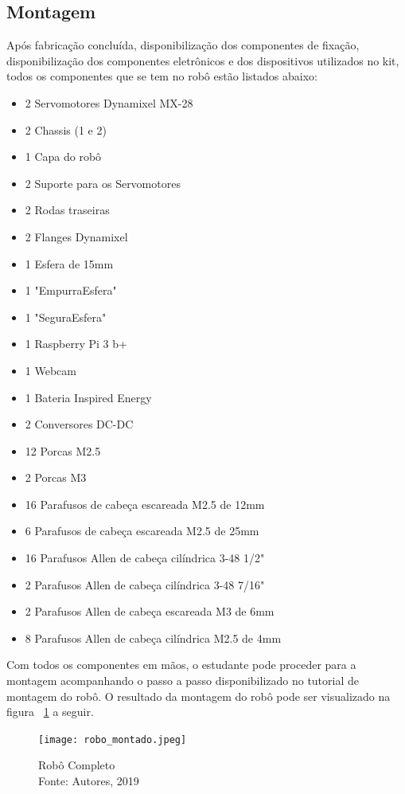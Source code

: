 \subsection{Montagem}
Após fabricação concluída, disponibilização dos componentes de fixação, disponibilização dos componentes eletrônicos e dos dispositivos utilizados no kit, todos os componentes que se tem no robô estão listados abaixo:
\begin{itemize}
	\item 2 Servomotores Dynamixel MX-28
	\item 2 Chassis (1 e 2)
	\item 1 Capa do robô
	\item 2 Suporte para os Servomotores
	\item 2 Rodas traseiras
	\item 2 Flanges Dynamixel
	\item 1 Esfera de 15mm
	\item 1 "EmpurraEsfera"
	\item 1 "SeguraEsfera"
	\item 1 Raspberry Pi 3 b+
	\item 1 Webcam
	\item 1 Bateria Inspired Energy
	\item 2 Conversores DC-DC
	\item 12 Porcas M2.5
	\item 2 Porcas M3
	\item 16 Parafusos de cabeça escareada M2.5 de 12mm
	\item 6 Parafusos de cabeça escareada M2.5 de 25mm
	\item 16 Parafusos Allen de cabeça cilíndrica 3-48 1/2"
	\item 2 Parafusos Allen de cabeça cilíndrica 3-48 7/16"
	\item 2 Parafusos Allen de cabeça escareada M3 de 6mm
	\item 8 Parafusos Allen de cabeça cilíndrica M2.5 de 4mm
\end{itemize}
Com todos os componentes em mãos, o estudante pode proceder para a montagem acompanhando o passo a passo disponibilizado no tutorial de montagem do robô. \cite{tutMont} O resultado da montagem do robô pode ser visualizado na figura ~\ref{fig:robo_montado} a seguir.

\begin{figure}[h!]
	\centering
	\texttt{[image: robo\_montado.jpeg]}\\
	\caption{Robô Completo \\ Fonte: Autores, 2019}
	\label{fig:robo_montado}
\end{figure}



